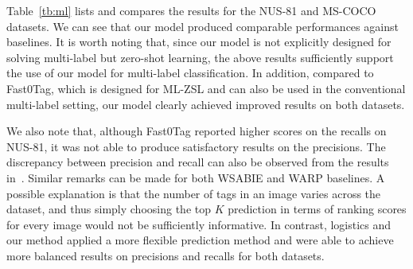 \documentclass[10pt,twocolumn,letterpaper]{article}
\begin{document}
Table~\ref{tb:ml} lists and compares the results for the NUS-81 and MS-COCO datasets. We can see that our model produced comparable performances against baselines. It is worth noting that, since our model is not explicitly designed for solving multi-label but zero-shot learning, the above results sufficiently support the use of our model for multi-label classification. In addition, compared to Fast0Tag, which is designed for ML-ZSL and can also be used in the conventional multi-label setting, our model clearly achieved improved results on both datasets.

We also note that, although Fast0Tag reported higher scores on the recalls on NUS-81, it was not able to produce satisfactory results on the precisions.
The discrepancy between precision and recall can also be observed from the results in~\cite{Zhang_2016_CVPR}.
Similar remarks can be made for both WSABIE and WARP baselines. A possible explanation is that the number of tags in an image varies across the dataset, and thus simply choosing the top $K$ prediction in terms of ranking scores for every image would not be sufficiently informative. In contrast, logistics and our method applied a more flexible prediction method and were able to achieve more balanced results on precisions and recalls for both datasets.
\end{document}
